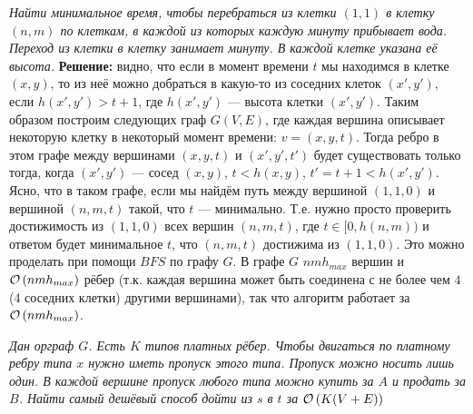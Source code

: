 \textit{Найти минимальное время, чтобы перебраться из клетки $(1,1)$ в клетку $(n,m)$ по клеткам, в каждой из
которых каждую минуту прибывает вода. Переход из клетки в клетку занимает минуту. В каждой клетке указана её высота.}
\textbf{Решение:} видно, что если в момент времени $t$ мы находимся в клетке $(x,y)$, то из неё можно добраться в какую-то
из соседних клеток $(x',y')$, если $h(x',y') > t+1$, где $h(x',y')$ --- высота клетки $(x',y')$. Таким образом построим
следующих граф $G(V,E)$, где каждая вершина описывает некоторую клетку в некоторый момент времени: $v = (x,y,t)$. Тогда
ребро в этом графе между вершинами $(x,y,t)$ и $(x',y',t')$ будет существовать только тогда, когда $(x',y')$ --- сосед 
$(x,y)$, $t < h(x,y)$, $t' = t + 1 < h(x',y')$. Ясно, что в таком графе, если мы найдём путь между вершиной $(1,1,0)$
и вершиной $(n,m,t)$ такой, что $t$ --- минимально. Т.е. нужно просто проверить достижимость из $(1,1,0)$ всех вершин 
$(n,m,t)$, где $t \in [0,h(n,m))$ и ответом будет минимальное $t$, что $(n,m,t)$ достижима из $(1,1,0)$. 
Это можно проделать при помощи $BFS$ по графу $G$. В графе $G$ $nmh_{max}$ вершин и $\mathcal{O}\left(nmh_{max}\right)$ рёбер (т.к. каждая
вершина может быть соединена с не более чем $4$ (4 соседних клетки) другими вершинами), так что
алгоритм работает за $\mathcal{O}\left(nmh_{max}\right)$. \xqed

\textit{Дан орграф $G$. Есть $K$ типов платных рёбер. Чтобы двигаться по платному ребру типа $x$ нужно иметь пропуск 
этого типа. Пропуск можно носить лишь один. В каждой вершине пропуск любого типа можно купить за $A$ и продать за $B$.
Найти самый дешёвый способ дойти из $s$ в $t$ за $\mathcal{O}\left(K(V+E)\right)$}
